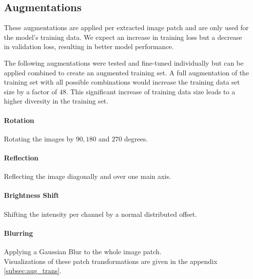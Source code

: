 \documentclass[
a4paper,     %
10pt         %
]{scrartcl}  %
\begin{document}
\subsection{Augmentations}
These augmentations are applied per extracted image patch and are only used for the model's training data.
We expect an increase in training loss but a decrease in validation loss, resulting in better model performance.

The following augmentations were tested and fine-tuned individually but can be applied combined to create an augmented training set.
A full augmentation of the training set with all possible combinations would increase the training data set size by a factor of $48$.
This significant increase of training data size leads to a higher diversity in the training set.

\paragraph{Rotation}
Rotating the images by $90, 180$ and $270$ degrees.

\paragraph{Reflection}
Reflecting the image diagonally and over one main axis.

\paragraph{Brightness Shift}
Shifting the intensity per channel by a normal distributed offset.

\paragraph{Blurring}
Applying a Gaussian Blur to the whole image patch.\\

Visualizations of these patch transformations are given in the appendix \ref{subsec:aug_trans}.
\end{document}
